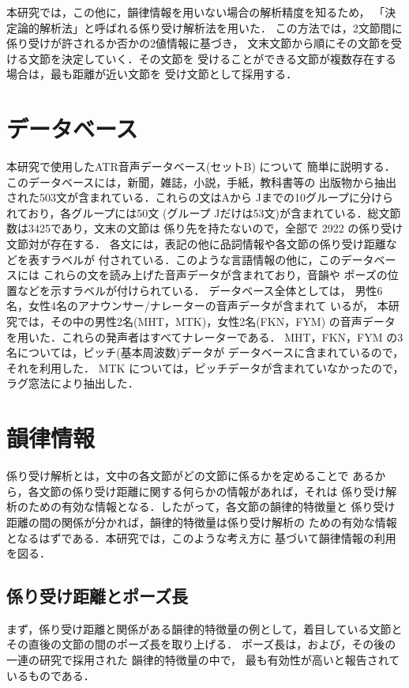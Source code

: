 本研究では，この他に，韻律情報を用いない場合の解析精度を知るため，
「決定論的解析法」と呼ばれる係り受け解析法\cite{KUR}を用いた．
この方法では，2文節間に係り受けが許されるか否かの2値情報に基づき，
文末文節から順にその文節を受ける文節を決定していく．その文節を
受けることができる文節が複数存在する場合は，最も距離が近い文節を
受け文節として採用する．

\section{データベース}
本研究で使用したATR音声データベース(セットB)
\cite{ATR}について
簡単に説明する．
このデータベースには，新聞，雑誌，小説，手紙，教科書等の
出版物から抽出された503文が含まれている．これらの文はAから
Jまでの10グループに分けられており，各グループには50文 (グループ
Jだけは53文)が含まれている．総文節数は3425であり，文末の文節は
係り先を持たないので，全部で 2922 の係り受け文節対が存在する．
各文には，表記の他に品詞情報や各文節の係り受け距離などを表すラベルが
付されている．このような言語情報の他に，このデータベースには
これらの文を読み上げた音声データが含まれており，音韻や
ポーズの位置などを示すラベルが付けられている．
データベース全体としては，
男性6名，女性4名のアナウンサー/ナレーターの音声データが含まれて
いるが，
本研究では，その中の男性2名(MHT，MTK)，女性2名(FKN，FYM)
の音声データを用いた．これらの発声者はすべてナレーターである．
MHT，FKN，FYM の3名については，ピッチ(基本周波数)データが
データベースに含まれているので，それを利用した．
MTK については，ピッチデータが含まれていなかったので，
ラグ窓法\cite{SAG}により抽出した．

\section{韻律情報}

係り受け解析とは，文中の各文節がどの文節に係るかを定めることで
あるから，各文節の係り受け距離に関する何らかの情報があれば，それは
係り受け解析のための有効な情報となる．したがって，各文節の韻律的特徴量と
係り受け距離の間の関係が分かれば，韻律的特徴量は係り受け解析の
ための有効な情報となるはずである．本研究では，このような考え方に
基づいて韻律情報の利用を図る．

\subsection{係り受け距離とポーズ長}
まず，係り受け距離と関係がある韻律的特徴量の例として，着目している文節と
その直後の文節の間のポーズ長を取り上げる．
ポーズ長は，\cite{EGU}および，その後の一連の研究で採用された
韻律的特徴量の中で，
最も有効性が高いと報告されているものである．

